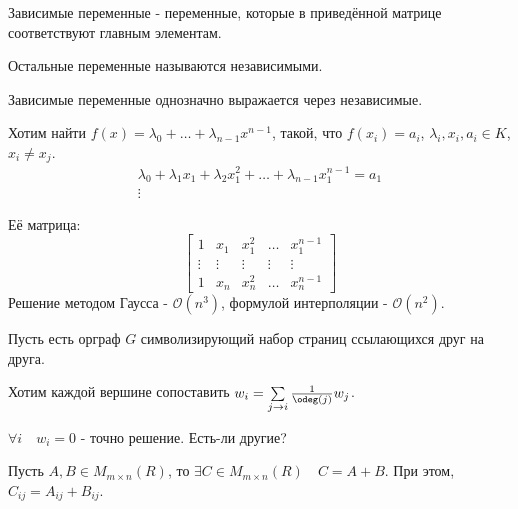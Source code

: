 \begin{definition} \thmslashn 

Зависимые переменные - переменные, которые в приведённой матрице соответствуют главным элементам.

Остальные переменные называются независимыми.
\end{definition}
\begin{lemma} \thmslashn

    Зависимые переменные однозначно выражается через независимые.
\end{lemma}
\begin{example} \thmslashn

    Хотим найти $f(x) = \lambda_0 + \ldots + \lambda_{n-1}x^{n-1}$, такой, что $f(x_{i}) = a_{i}$, $\lambda_{i}, x_{i}, a_{i}\in K$, $x_i \neq x_j$.
    \begin{equation*}
        \begin{split}
            \lambda_0 + \lambda_1 x_1 + \lambda_2 x_1^2 + \ldots + \lambda_{n-1}x_1^{n-1} = a_1\\
            \vdots
        \end{split}
    \end{equation*}

    Её матрица:
    \begin{equation*}
        \begin{bmatrix} 
            1 & x_1 & x_1^2 & \ldots & x_1^{n-1}\\
            \vdots & \vdots & \vdots & \vdots& \vdots\\
            1 & x_{n} & x_{n}^2 & \ldots & x_{n}^{n-1}
        \end{bmatrix} 
    \end{equation*}
    Решение методом Гаусса - $\mathcal{O}(n^3)$, формулой интерполяции - $\mathcal{O}(n^2)$.
\end{example}
\begin{example}[Pagerank] \thmslashn

    Пусть есть орграф $G$ символизирующий набор страниц ссылающихся друг на друга.

    Хотим каждой вершине сопоставить $w_{i} = \sum\limits_{j \to i} \frac{1}{\odeg(j)}w_{j}$.

    $\forall{i}\quad w_{i} = 0$ - точно решение. Есть-ли другие?
\end{example}
\begin{definition} \thmslashn 

    Пусть $A, B\in M_{m \times n}(R)$, то $\exists{C\in M_{m \times n}(R)}\quad C = A+B$. При этом, $C_{ij} = A_{ij} + B_{ij}$.
\end{definition}
